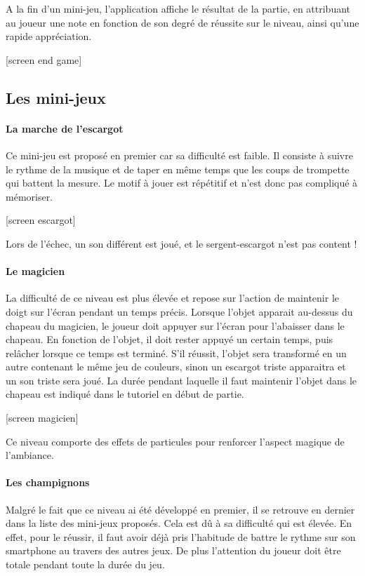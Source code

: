 A la fin d'un mini-jeu, l'application affiche le résultat de la partie, en attribuant au joueur une note en fonction de son degré de réussite sur le niveau, ainsi qu'une rapide appréciation.

[screen end game]

\subsection{Les mini-jeux}

\paragraph{La marche de l'escargot}

Ce mini-jeu est proposé en premier car sa difficulté est faible. Il consiste à suivre le rythme de la musique et de taper en même temps que les coups de trompette qui battent la mesure. Le motif à jouer est répétitif et n'est donc pas compliqué à mémoriser.

[screen escargot]

Lors de l'échec, un son différent est joué, et le sergent-escargot n'est pas content !


\paragraph{Le magicien}

La difficulté de ce niveau est plus élevée et repose sur l'action de maintenir le doigt sur l'écran pendant un temps précis. Lorsque l'objet apparait au-dessus du chapeau du magicien, le joueur doit appuyer sur l'écran pour l'abaisser dans le chapeau. En fonction de l'objet, il doit rester appuyé un certain temps, puis relâcher lorsque ce temps est terminé. S'il réussit, l'objet sera transformé en un autre contenant le même jeu de couleurs, sinon un escargot triste apparaitra et un son triste sera joué. La durée pendant laquelle il faut maintenir l'objet dans le chapeau est indiqué dans le tutoriel en début de partie.

[screen magicien]

Ce niveau comporte des effets de particules pour renforcer l'aspect magique de l'ambiance.

\paragraph{Les champignons}

Malgré le fait que ce niveau ai été développé en premier, il se retrouve en dernier dans la liste des mini-jeux proposés. Cela est dû à sa difficulté qui est élevée. En effet, pour le réussir, il faut avoir déjà pris l'habitude de battre le rythme sur son smartphone au travers des autres jeux. De plus l'attention du joueur doit être totale pendant toute la durée du jeu.

